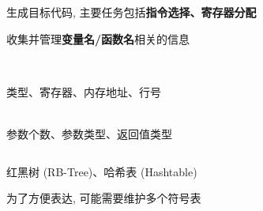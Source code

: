 \begin{frame}{}
  \begin{center}
     生成目标代码, 主要任务包括{\bf 指令选择、寄存器分配}

    \vspace{0.80cm}
  \end{center}
\end{frame}

\begin{frame}{}
  \begin{center}
     收集并管理{\bf 变量名/函数名}相关的信息
  \end{center}

  \begin{columns}
      \begin{center}
         \\[3pt]
        类型、寄存器、内存地址、行号

        \vspace{0.50cm}
         \\[3pt]
        参数个数、参数类型、返回值类型
      \end{center}
  \end{columns}
\end{frame}

\begin{frame}{}

  \vspace{0.50cm}
  \begin{center}
    红黑树 (RB-Tree)、哈希表 (Hashtable)
  \end{center}
\end{frame}

\begin{frame}{}
  \begin{center}
    为了方便表达, 可能需要维护多个符号表
  \end{center}

\end{frame}
